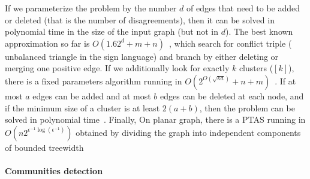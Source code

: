 If we parameterize the problem by the number $d$ of edges that need to be added or deleted (that is
the number of disagreements), then it can be solved in polynomial time in the size of the input
graph (but not in $d$). The best known approximation so far is
$O(1.62^d+m+n)$~\autocite{GoldenCE12}, which search for conflict triple (\ie{} unbalanced triangle
in the sign language) and branch by either deleting or merging one positive edge. If we additionally
look for exactly $k$ clusters (\ie \mind$[k]$), there is a fixed parameters algorithm running in
$O(2^{O(\sqrt{kd})}+n+m)$~\autocite{Fomin2014}. If at most $a$ edges can be added and at most $b$
edges can be deleted at each node, and if the minimum size of a cluster is at least $2(a+b)$, then
the problem can be solved in polynomial time~\autocite{Abu-Khzam2015}. Finally, On planar graph,
there is a PTAS running in $O(n2^{\epsilon^{-1}\log(\epsilon^{-1})})$ obtained by dividing the graph
into independent components of bounded treewidth~\autocite{PlanarCEPTAS17}

\paragraph{Communities detection}

